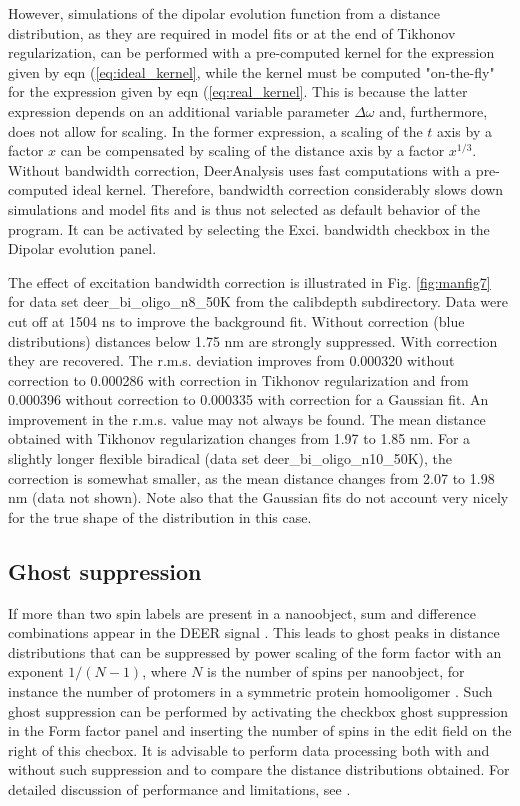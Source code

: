 \documentclass{article}
\begin{document}
However, simulations of the dipolar evolution function from a distance distribution, as they are required in model fits or at the end of Tikhonov regularization, can be performed with a pre-computed kernel for the expression given by eqn (\ref{eq:ideal_kernel}, while the kernel must be computed "on-the-fly" for the expression given by eqn (\ref{eq:real_kernel}. This is because the latter expression depends on an additional variable parameter $\Delta \omega$ and, furthermore, does not allow for scaling. In the former expression, a scaling of the $t$ axis by a factor $x$ can be compensated by scaling of the distance axis by a factor $x^{1/3}$. Without bandwidth correction, DeerAnalysis uses fast computations with a pre-computed ideal kernel. Therefore, bandwidth correction considerably slows down simulations and model fits and is thus not selected as default behavior of the program. It can be activated by selecting the {\ttfamily Exci. bandwidth} checkbox in the {\ttfamily Dipolar evolution} panel.

The effect of excitation bandwidth correction is illustrated in Fig. \ref{fig:manfig7} for data set {\ttfamily deer\_bi\_oligo\_n8\_50K} from the {\ttfamily calibdepth} subdirectory. Data were cut off at 1504 ns to improve the background fit. Without correction (blue distributions) distances below 1.75 nm are strongly suppressed. With correction they are recovered. The r.m.s. deviation improves from 0.000320 without correction to 0.000286 with correction in Tikhonov regularization and from 0.000396 without correction to 0.000335 with correction for a Gaussian fit. An improvement in the r.m.s. value may not always be found. The mean distance obtained with Tikhonov regularization changes from 1.97 to 1.85 nm. For a slightly longer flexible biradical (data set {\ttfamily deer\_bi\_oligo\_n10\_50K}), the correction is somewhat smaller, as the mean distance changes from 2.07 to 1.98 nm (data not shown). Note also that the Gaussian fits do not account very nicely for the true shape of the distribution in this case.

\subsection{Ghost suppression}
\label{ghost_suppression}
If more than two spin labels are present in a nanoobject, sum and difference combinations appear in the DEER signal \cite{jeschke2009b}. This leads to ghost peaks in distance distributions that can be suppressed by power scaling of the form factor with an exponent $1/(N-1)$, where $N$ is the number of spins per nanoobject, for instance the number of protomers in a symmetric protein homooligomer \cite{vonHagens2013}. Such ghost suppression can be performed by activating the checkbox {\ttfamily ghost suppression} in the {\ttfamily Form factor} panel and inserting the number of spins in the edit field on the right of this checbox. It is advisable to perform data processing both with and without such suppression and to compare the distance distributions obtained. For detailed discussion of performance and limitations, see \cite{vonHagens2013}.
\end{document}
